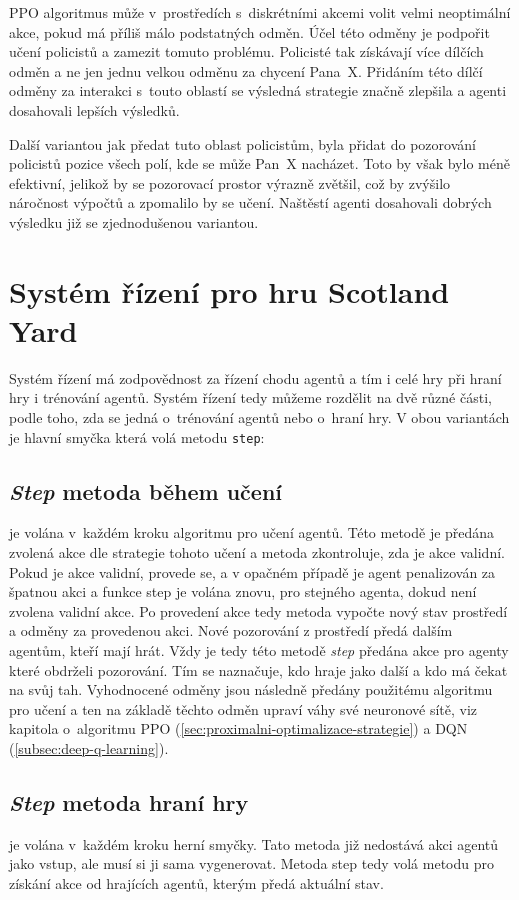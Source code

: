 PPO algoritmus může v~prostředích s~diskrétními akcemi volit velmi neoptimální akce, pokud má příliš málo podstatných odměn\cite{PPO_weakness}.
Účel této odměny je podpořit učení policistů a zamezit tomuto problému.
Policisté tak získávají více dílčích odměn a ne jen jednu velkou odměnu za chycení Pana~X\@.
Přidáním této dílčí odměny za interakci s~touto oblastí se výsledná strategie značně zlepšila a agenti dosahovali lepších výsledků.

Další variantou jak předat tuto oblast policistům, byla přidat do pozorování policistů pozice všech polí, kde se může Pan~X nacházet.
Toto by však bylo méně efektivní, jelikož by se pozorovací prostor výrazně zvětšil, což by zvýšilo náročnost výpočtů a zpomalilo by se učení.
Naštěstí agenti dosahovali dobrých výsledku již se zjednodušenou variantou.

\section{Systém řízení pro hru Scotland Yard}
\label{sec:system-rideni}
Systém řízení má zodpovědnost za řízení chodu agentů a tím i celé hry při hraní hry i trénování agentů.
Systém řízení tedy můžeme rozdělit na dvě různé části, podle toho, zda se jedná o~trénování agentů nebo o~hraní hry.
V obou variantách je hlavní smyčka která volá metodu \texttt{step}:

\subsection{\emph{Step} metoda během učení} je volána v~každém kroku algoritmu pro učení agentů.
Této metodě je předána zvolená akce dle strategie tohoto učení a metoda zkontroluje, zda je akce validní.
Pokud je akce validní, provede se, a v opačném případě je agent penalizován za špatnou akci a funkce step je volána znovu, pro stejného agenta, dokud není zvolena validní akce.
Po provedení akce tedy metoda vypočte nový stav prostředí a odměny za provedenou akci.
Nové pozorování z prostředí předá dalším agentům, kteří mají hrát.
Vždy je tedy této metodě \emph{step} předána akce pro agenty které obdrželi pozorování.
Tím se naznačuje, kdo hraje jako další a kdo má čekat na svůj tah.
Vyhodnocené odměny jsou následně předány použitému algoritmu pro učení a ten na základě těchto odměn upraví váhy své neuronové sítě, viz kapitola o~algoritmu PPO (\ref{sec:proximalni-optimalizace-strategie}) a DQN (\ref{subsec:deep-q-learning}).

\subsection{\emph{Step} metoda hraní hry} je volána v~každém kroku  herní smyčky.
Tato metoda již nedostává akci agentů jako vstup, ale musí si ji sama vygenerovat.
Metoda step tedy volá metodu pro získání akce od hrajících agentů, kterým předá aktuální stav.

